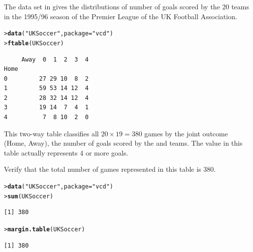 \documentclass[10pt]{report}\usepackage[]{graphicx}\usepackage[]{color}
\makeatletter
\newcommand{\hlstr}[1]{\textcolor[rgb]{0.192,0.494,0.8}{#1}}%
\newcommand{\hlstd}[1]{\textcolor[rgb]{0.345,0.345,0.345}{#1}}%
\newcommand{\hlkwc}[1]{\textcolor[rgb]{0.333,0.667,0.333}{#1}}%
\newcommand{\hlkwd}[1]{\textcolor[rgb]{0.737,0.353,0.396}{\textbf{#1}}}%
\newenvironment{kframe}{%
 \def\at@end@of@kframe{}%
 \ifinner\ifhmode%
  \def\at@end@of@kframe{\end{minipage}}%
  \begin{minipage}{\columnwidth}%
 \fi\fi%
 \def\FrameCommand##1{\hskip\@totalleftmargin \hskip-\fboxsep
 \colorbox{shadecolor}{##1}\hskip-\fboxsep
     \hskip-\linewidth \hskip-\@totalleftmargin \hskip\columnwidth}%
 \MakeFramed {\advance\hsize-\width
   \@totalleftmargin\z@ \linewidth\hsize
   \@setminipage}}%
 {\par\unskip\endMakeFramed%
 \at@end@of@kframe}
\newenvironment{knitrout}{}{} %
\renewenvironment{knitrout}{\small\renewcommand{\baselinestretch}{.85}}{} %
\makeatother
\begin{document}
\begin{Exercises}
\begin{enumerate*}
  \end{enumerate*}

\exercise The data set  in  gives the distributions of
number of goals scored by the 20 teams in the  1995/96 season of the
Premier League of the UK Football Association.
\begin{knitrout}\footnotesize
{}\color{fgcolor}\begin{kframe}
\begin{alltt}
\hlstd{> }\hlkwd{data}\hlstd{(}\hlstr{"UKSoccer"}\hlstd{,} \hlkwc{package} \hlstd{=} \hlstr{"vcd"}\hlstd{)}
\hlstd{> }\hlkwd{ftable}\hlstd{(UKSoccer)}
\end{alltt}
\begin{verbatim}
     Away  0  1  2  3  4
Home                    
0         27 29 10  8  2
1         59 53 14 12  4
2         28 32 14 12  4
3         19 14  7  4  1
4          7  8 10  2  0
\end{verbatim}
\end{kframe}
\end{knitrout}
This two-way table classifies all $20 \times 19 = 380$ games by the joint
outcome (Home, Away), the number of goals scored by the  and
 teams.
The value  in this table actually represents 4 or more goals.

  \begin{enumerate*}
    \item Verify that the total number of games represented in this table is 380.
    \begin{ans}
\begin{knitrout}\footnotesize
{}\color{fgcolor}\begin{kframe}
\begin{alltt}
\hlstd{> }\hlkwd{data}\hlstd{(}\hlstr{"UKSoccer"}\hlstd{,} \hlkwc{package}\hlstd{=}\hlstr{"vcd"}\hlstd{)}
\hlstd{> }\hlkwd{sum}\hlstd{(UKSoccer)}
\end{alltt}
\begin{verbatim}
[1] 380
\end{verbatim}
\begin{alltt}
\hlstd{> }\hlkwd{margin.table}\hlstd{(UKSoccer)}
\end{alltt}
\begin{verbatim}
[1] 380
\end{verbatim}
\end{kframe}
\end{knitrout}
    \end{ans}
    

\end{enumerate*}
\end{Exercises}
\end{document}
